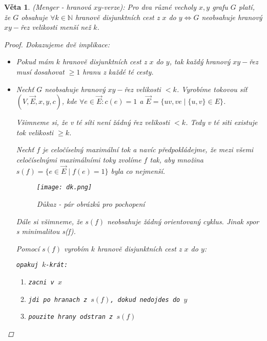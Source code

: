 \documentclass[10pt,a4paper]{article}
\newtheorem{veta}{Věta}
\newcommand{\N}{{\mathbb{N}}}       %
\newcommand\makesmall{\fontsize{8pt}{11pt}\selectfont}
\begin{document}
\begin{veta} (Menger - hranová $xy$-verze): \normalfont
    Pro dva různé vecholy $x,y$ grafu $G$ platí, že $G$ obsahuje $\forall k \in \N$ hranově disjunktních cest z $x$ do $y \iff G$ neobsahuje hranový $xy-$řez velikosti menší než $k$.
    \begin{proof} Dokazujeme dvě implikace:
        \begin{itemize}
            \item [$\implies$] Pokud mám $k$ hranově disjunktních cest z $x$ do $y$, tak každý hranový $xy-$řez musí dosahovat $\geq 1$ hranu z každé té cesty.
            \item [$\Longleftarrow$] Nechť $G$ neobsahuje hranový $xy-$řez velikosti $<k$. Vyrobíme tokovou síť $(V, \vec{E}, x,y,c)$, kde $\forall e \in \vec{E}: c(e)=1$ a $\vec{E}= \{uv, ve \mid \{u,v\} \in E\}$.
            
            Všimneme si, že v  té síti není žádný řez velikosti $<k$.
            Tedy v té siti existuje tok velikosti $\geq k$. 

            Nechť $f$ je celočíselný maximální tok a navíc předpokládejme, že mezi všemi celočíselnými maximálními toky zvolíme $f$ tak, aby množina $s(f)=\{e\in \vec{E}\mid f(e)=1\}$ byla co nejmenší.

            \begin{figure}[h]
                \caption{\makesmall\textit{Důkaz - pár obrázků pro pochopení}}
                \centering
                \texttt{[image: dk.png]}
            \end{figure}

            Dále si všimneme, že $s(f)$ neobsahuje žádný orientovaný cyklus. \textit{Jinak spor s minimalitou s(f)}.

            Pomocí $s(f)$ vyrobím $k$ hranově disjunktních cest z $x$ do $y$:
            
            \texttt{opakuj $k$-krát:}
            \begin{enumerate}
                \item \texttt{zacni v $x$}
                \item \texttt{jdi po hranach z $s(f)$, dokud nedojdes do $y$}
                \item \texttt{pouzite hrany odstran z $s(f)$}
            \end{enumerate}
        \end{itemize}
    \end{proof}
\end{veta}
\end{document}
